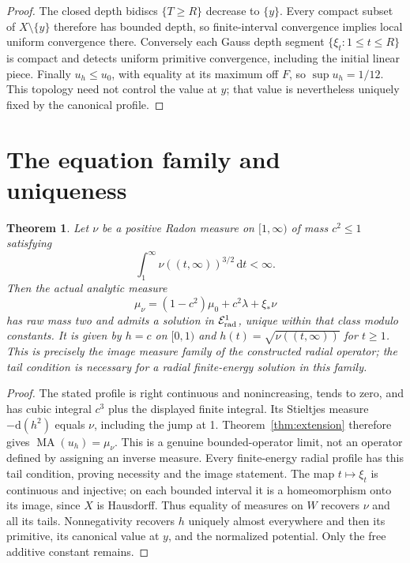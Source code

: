 \documentclass[11pt]{article}
\newtheorem{theorem}{Theorem}
\newcommand{\MA}{\operatorname{MA}}
\begin{document}
\begin{proof}
The closed depth bidiscs $\{T\geq R\}$ decrease to $\{y\}$.
Every compact subset of $X\setminus\{y\}$ therefore has bounded depth,
so finite-interval convergence implies local uniform convergence there.
Conversely each Gauss depth segment $\{\xi_t:1\leq t\leq R\}$ is compact
and detects uniform primitive convergence, including the initial linear
piece. Finally $u_h\leq u_0$, with equality at its maximum off $F$, so
$\sup u_h=1/12$. This topology need not control the value at $y$; that
value is nevertheless uniquely fixed by the canonical profile.
\end{proof}

\section{The equation family and uniqueness}
\begin{theorem}\label{thm:equation}
Let $\nu$ be a positive Radon measure on $[1,\infty)$ of mass $c^2\leq1$
satisfying
\[
 \int_1^\infty\nu((t,\infty))^{3/2}\,\mathrm dt<\infty.
\]
Then the actual analytic measure
\[
 \mu_\nu=(1-c^2)\mu_0+c^2\lambda+\xi_*\nu
\]
has raw mass two and admits a solution in $\mathcal E^1_{\rm rad}$,
unique within that class modulo constants. It is given by
$h=c$ on $[0,1)$ and $h(t)=\sqrt{\nu((t,\infty))}$ for $t\geq1$.
This is precisely the image measure family of the constructed radial
operator; the tail condition is necessary for a radial finite-energy
solution in this family.
\end{theorem}
\begin{proof}
The stated profile is right continuous and nonincreasing, tends to zero,
and has cubic integral $c^3$ plus the displayed finite integral.
Its Stieltjes measure $-\mathrm d(h^2)$ equals $\nu$, including the jump
at 1. Theorem~\ref{thm:extension} therefore gives $\MA(u_h)=\mu_\nu$.
This is a genuine bounded-operator limit, not an operator defined by
assigning an inverse measure. Every finite-energy radial profile has this
tail condition, proving necessity and the image statement.
The map $t\mapsto\xi_t$ is continuous and injective; on each bounded
interval it is a homeomorphism onto its image, since $X$ is Hausdorff.
Thus equality of measures on $W$ recovers $\nu$ and all its tails.
Nonnegativity recovers $h$ uniquely almost everywhere and then its
primitive, its canonical value at $y$, and the normalized potential.
Only the free additive constant remains.
\end{proof}
\end{document}
